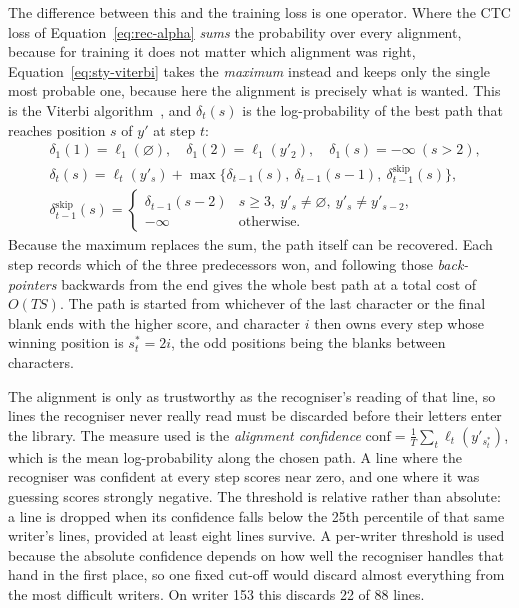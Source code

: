 The difference between this and the training loss is one operator. Where the CTC loss of Equation~\ref{eq:rec-alpha} \emph{sums} the probability over every alignment, because for training it does not matter which alignment was right, Equation~\ref{eq:sty-viterbi} takes the \emph{maximum} instead and keeps only the single most probable one, because here the alignment is precisely what is wanted. This is the Viterbi algorithm~\cite{viterbi1967}, and $\delta_t(s)$ is the log-probability of the best path that reaches position $s$ of $y'$ at step $t$:
\begin{equation}
\begin{split}
&\delta_1(1)=\ell_1(\varnothing),\quad\delta_1(2)=\ell_1(y'_2),\quad\delta_1(s)=-\infty\ (s>2),\\
&\delta_t(s)=\ell_t(y'_s)+\max\bigl\{\delta_{t-1}(s),\ \delta_{t-1}(s-1),\ \delta^{\mathrm{skip}}_{t-1}(s)\bigr\},\\
&\delta^{\mathrm{skip}}_{t-1}(s)=\begin{cases}\delta_{t-1}(s-2)&s\ge3,\ y'_s\ne\varnothing,\ y'_s\ne y'_{s-2},\\-\infty&\text{otherwise.}\end{cases}
\end{split}
\label{eq:sty-viterbi}
\end{equation}
Because the maximum replaces the sum, the path itself can be recovered. Each step records which of the three predecessors won, and following those \emph{back-pointers} backwards from the end gives the whole best path at a total cost of $O(TS)$. The path is started from whichever of the last character or the final blank ends with the higher score, and character $i$ then owns every step whose winning position is $s^*_t=2i$, the odd positions being the blanks between characters.

The alignment is only as trustworthy as the recogniser's reading of that line, so lines the recogniser never really read must be discarded before their letters enter the library. The measure used is the \emph{alignment confidence} $\mathrm{conf}=\frac1T\sum_t\ell_t(y'_{s^*_t})$, which is the mean log-probability along the chosen path. A line where the recogniser was confident at every step scores near zero, and one where it was guessing scores strongly negative. The threshold is relative rather than absolute: a line is dropped when its confidence falls below the 25th percentile of that same writer's lines, provided at least eight lines survive. A per-writer threshold is used because the absolute confidence depends on how well the recogniser handles that hand in the first place, so one fixed cut-off would discard almost everything from the most difficult writers. On writer 153 this discards 22 of 88 lines.

